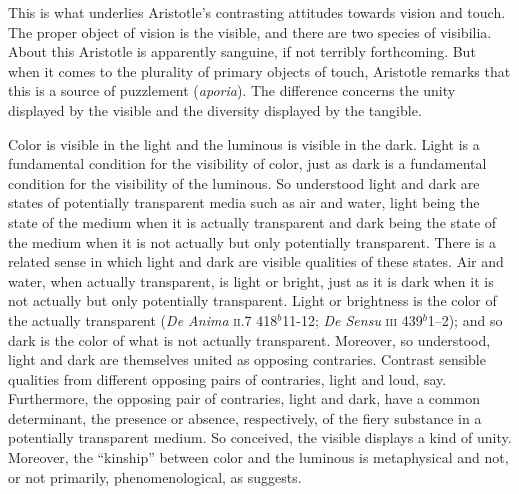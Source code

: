 This is what underlies Aristotle's contrasting attitudes towards vision and touch. The proper object of vision is the visible, and there are two species of visibilia. About this Aristotle is apparently sanguine, if not terribly forthcoming. But when it comes to the plurality of primary objects of touch, Aristotle remarks that this is a source of puzzlement (\emph{aporia}). The difference concerns the unity displayed by the visible and the diversity displayed by the tangible. 

Color is visible in the light and the luminous is visible in the dark. Light is a fundamental condition for the visibility of color, just as dark is a fundamental condition for the visibility of the luminous. So understood light and dark are states of potentially transparent media such as air and water, light being the state of the medium when it is actually transparent and dark being the state of the medium when it is not actually but only potentially transparent. There is a related sense in which light and dark are visible qualities of these states. Air and water, when actually transparent, is light or bright, just as it is dark when it is not actually but only potentially transparent. Light or brightness is the color of the actually transparent (\emph{De Anima} \textsc{ii}.7 418\( ^{b} \)11-12; \emph{De Sensu} \textsc{iii} 439\( ^{b} \)1--2); and so dark is the color of what is not actually transparent. Moreover, so understood, light and dark are themselves united as opposing contraries. Contrast sensible qualities from different opposing pairs of contraries, light and loud, say. Furthermore, the opposing pair of contraries, light and dark, have a common determinant, the presence or absence, respectively, of the fiery substance in a potentially transparent medium. So conceived, the visible displays a kind of unity. Moreover, the ``kinship'' between color and the luminous is metaphysical and not, or not primarily, phenomenological, as \citet[63]{Sorabji:1971fr} suggests.


